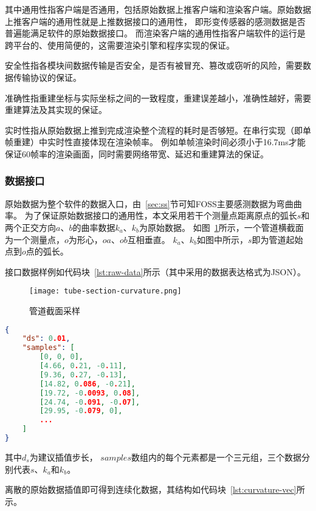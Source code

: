其中通用性指客户端是否通用，包括原始数据上推客户端和渲染客户端。原始数据上推客户端的通用性就是上推数据接口的通用性，
即形变传感器的感测数据是否普遍能满足软件的原始数据接口。
而渲染客户端的通用性指客户端软件的运行是跨平台的、使用简便的，这需要渲染引擎和程序实现的保证。

安全性指各模块间数据传输是否安全，是否有被冒充、篡改或窃听的风险，需要数据传输协议的保证。

准确性指重建坐标与实际坐标之间的一致程度，重建误差越小，准确性越好，需要重建算法及其实现的保证。

实时性指从原始数据上推到完成渲染整个流程的耗时是否够短。在串行实现（即单帧重建）中实时性直接体现在渲染帧率。
例如单帧渲染时间必须小于16.7ms才能保证60帧率的渲染画面，同时需要网络带宽、延迟和重建算法的保证。

\subsubsection{数据接口}

原始数据为整个软件的数据入口，由~\ref{sec:ss}节可知FOSS主要感测数据为弯曲曲率。
为了保证原始数据接口的通用性，本文采用若干个测量点距离原点的弧长$s$和两个正交方向$a$、$b$的曲率数据$k_a$、$k_b$为原始数据。
如图~\ref{fig:tube-section}所示，一个管道横截面为一个测量点，$o$为形心，$oa$、$ob$互相垂直。
$k_a$、$k_b$如图中所示，$s$即为管道起始点到$o$点的弧长。

接口数据样例如代码块~\ref{lst:raw-data}所示（其中采用的数据表达格式为JSON\cite{rfc7159}）。

\begin{figure}
\centering
\texttt{[image: tube-section-curvature.png]}
\caption{管道截面采样}
\label{fig:tube-section} 
\end{figure}


\begin{lstlisting}[language=json,firstnumber=1,label={lst:raw-data},caption={原始曲率数据样例}]
{
    "ds": 0.01,
    "samples": [
        [0, 0, 0],
        [4.66, 0.21, -0.11],
        [9.36, 0.27, -0.13],
        [14.82, 0.086, -0.21],
        [19.72, -0.0093, 0.08],
        [24.74, -0.091, -0.07],
        [29.95, -0.079, 0],
        ...
    ]
}
\end{lstlisting}

其中$d_s$为建议插值步长，
$samples$数组内的每个元素都是一个三元组，三个数据分别代表$s$、$k_a$和$k_b$。

离散的原始数据插值即可得到连续化数据，其结构如代码块~\ref{lst:curvature-vec}所示。

